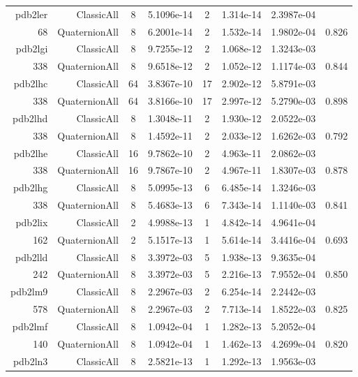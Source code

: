 \begin{xltabular}{\textwidth}{r|rcS[table-format=1.4e+2]cS[table-format=1.3e+2]S[table-format=1.4e+2]S[table-format=-1.3]}
pdb2ler & ClassicAll & 8 & 5.1096e-14 & 2 & 1.314e-14 & 2.3987e-04 & \\
68 & QuaternionAll & 8 & 6.2001e-14 & 2 & 1.532e-14 & 1.9802e-04 & 0.826\\  \addlinespace
pdb2lgi & ClassicAll & 8 & 9.7255e-12 & 2 & 1.068e-12 & 1.3243e-03 & \\
338 & QuaternionAll & 8 & 9.6518e-12 & 2 & 1.052e-12 & 1.1174e-03 & 0.844\\  \addlinespace
pdb2lhc & ClassicAll & 64 & 3.8367e-10 & 17 & 2.902e-12 & 5.8791e-03 & \\
338 & QuaternionAll & 64 & 3.8166e-10 & 17 & 2.997e-12 & 5.2790e-03 & 0.898\\  \addlinespace
pdb2lhd & ClassicAll & 8 & 1.3048e-11 & 2 & 1.930e-12 & 2.0522e-03 & \\
338 & QuaternionAll & 8 & 1.4592e-11 & 2 & 2.033e-12 & 1.6262e-03 & 0.792\\  \addlinespace
pdb2lhe & ClassicAll & 16 & 9.7862e-10 & 2 & 4.963e-11 & 2.0862e-03 & \\
338 & QuaternionAll & 16 & 9.7867e-10 & 2 & 4.967e-11 & 1.8307e-03 & 0.878\\  \addlinespace
pdb2lhg & ClassicAll & 8 & 5.0995e-13 & 6 & 6.485e-14 & 1.3246e-03 & \\
338 & QuaternionAll & 8 & 5.4683e-13 & 6 & 7.343e-14 & 1.1140e-03 & 0.841\\  \addlinespace
pdb2lix & ClassicAll & 2 & 4.9988e-13 & 1 & 4.842e-14 & 4.9641e-04 & \\
162 & QuaternionAll & 2 & 5.1517e-13 & 1 & 5.614e-14 & 3.4416e-04 & 0.693\\  \addlinespace
pdb2lld & ClassicAll & 8 & 3.3972e-03 & 5 & 1.938e-13 & 9.3635e-04 & \\
242 & QuaternionAll & 8 & 3.3972e-03 & 5 & 2.216e-13 & 7.9552e-04 & 0.850\\  \addlinespace
pdb2lm9 & ClassicAll & 8 & 2.2967e-03 & 2 & 6.254e-14 & 2.2442e-03 & \\
578 & QuaternionAll & 8 & 2.2967e-03 & 2 & 7.713e-14 & 1.8522e-03 & 0.825\\  \addlinespace
pdb2lmf & ClassicAll & 8 & 1.0942e-04 & 1 & 1.282e-13 & 5.2052e-04 & \\
140 & QuaternionAll & 8 & 1.0942e-04 & 1 & 1.462e-13 & 4.2699e-04 & 0.820\\  \addlinespace
pdb2ln3 & ClassicAll & 8 & 2.5821e-13 & 1 & 1.292e-13 & 1.9563e-03 & \\

\end{xltabular}
